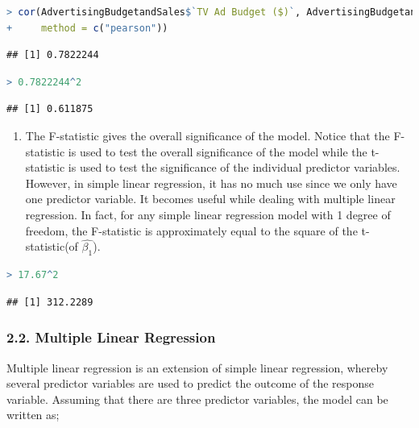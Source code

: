 \documentclass[
]{article}
\providecommand{\tightlist}{%
  \setlength{\itemsep}{0pt}\setlength{\parskip}{0pt}}
\begin{document}
\begin{lstlisting}[language=R]
> cor(AdvertisingBudgetandSales$`TV Ad Budget ($)`, AdvertisingBudgetandSales$`Sales ($)`,
+     method = c("pearson"))
\end{lstlisting}

\begin{lstlisting}
## [1] 0.7822244
\end{lstlisting}

\begin{lstlisting}[language=R]
> 0.7822244^2
\end{lstlisting}

\begin{lstlisting}
## [1] 0.611875
\end{lstlisting}

\begin{enumerate}
\def\labelenumi{\arabic{enumi}.}
\setcounter{enumi}{2}
\tightlist
\item
  The F-statistic gives the overall significance of the model. Notice
  that the F-statistic is used to test the overall significance of the
  model while the t-statistic is used to test the significance of the
  individual predictor variables. However, in simple linear regression,
  it has no much use since we only have one predictor variable. It
  becomes useful while dealing with multiple linear regression. In fact,
  for any simple linear regression model with 1 degree of freedom, the
  F-statistic is approximately equal to the square of the t-statistic(of
  \(\hat{\beta_1}\)).
\end{enumerate}

\begin{lstlisting}[language=R]
> 17.67^2
\end{lstlisting}

\begin{lstlisting}
## [1] 312.2289
\end{lstlisting}

\hypertarget{multiple-linear-regression}{%
\subsubsection{2.2. Multiple Linear
Regression}\label{multiple-linear-regression}}

Multiple linear regression is an extension of simple linear regression,
whereby several predictor variables are used to predict the outcome of
the response variable. Assuming that there are three predictor
variables, the model can be written as;
\end{document}
